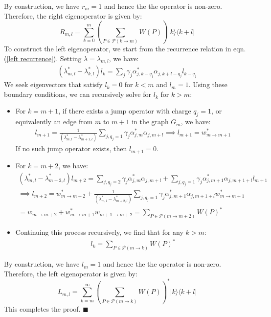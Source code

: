 \documentclass[11pt,a4paper]{article}
\begin{document}
By construction, we have $r_m = 1$ and hence the the operator is non-zero. Therefore, the right eigenoperator is given by:
\begin{equation}
    R_{m,l} = \sum_{k=0}^{m} \left( \sum_{P \in \mathcal{P}(k \to m)} W(P) \right) |k\rangle \langle k+l|
\end{equation}
To construct the left eigenoperator, we start from the recurrence relation in eqn.(\ref{left recurrence}). Setting $\lambda = \lambda_{m,l}$, we have:
\begin{align}
    \left( \lambda_{m,l}^* - \lambda_{k,l}^* \right) l_k = \sum_{j} \gamma_j \alpha_{j,k - q_j}^* \alpha_{j,k+l - q_j} l_{k - q_j}
\end{align}
We seek eigenvectors that satisfy $l_k = 0$ for $k < m$ and $l_m = 1$. Using these boundary conditions, we can recursively solve for $l_k$ for $k > m$:
\begin{itemize}
    \item For $k = m+1$, if there exists a jump operator with charge $q_j = 1$, or equivalently an edge from $m$ to $m+1$ in the graph $G_m$, we have:
    \begin{align}
    l_{m+1} = \frac{1}{ \left( \lambda_{m,l}^* - \lambda_{m+1,l}^* \right)} \sum_{j, q_j=1} \gamma_j \alpha_{j,m}^* \alpha_{j,m+l}  \implies l_{m+1} = w_{m \rightarrow m+1}^*
    \end{align}
    If no such jump operator exists, then $l_{m+1} = 0$.
    \item For $k = m+2$, we have:
    \begin{gather}
        \left( \lambda_{m,l}^* - \lambda_{m+2,l}^* \right) l_{m+2} =  \sum_{j, q_j = 2} \gamma_j \alpha_{j,m}^* \alpha_{j,m+l}  + \sum_{j, q_j = 1} \gamma_j \alpha_{j,m+1 }^* \alpha_{j,m+1+l } l_{m+1} \\
        \implies l_{m+2} =  w_{m \rightarrow m+2}^* + \frac{1}{ \left( \lambda_{m,l}^* - \lambda_{m+2,l}^* \right)} \sum_{j, q_j = 1} \gamma_j \alpha_{j,m+1}^* \alpha_{j,m+1+l } w_{m \rightarrow m+1}^* \\
        =  w_{m \rightarrow m+2} + w_{m \rightarrow m+1}^* w_{m+1 \rightarrow m+2} = \sum_{P \in \mathcal{P}(m \to m+2)} W(P)^* 
    \end{gather}
    \item Continuing this process recursively, we find that for any $k > m$:
    \begin{align}
        l_k = \sum_{P \in \mathcal{P}(m \to k)} W(P)^*
    \end{align}
\end{itemize}
By construction, we have $l_m = 1$ and hence the the operator is non-zero. Therefore, the left eigenoperator is given by:
\begin{equation}
    L_{m,l} = \sum_{k=m}^{\infty} \left( \sum_{P \in \mathcal{P}(m \to k)} W(P) \right)^* |k\rangle \langle k+l|
\end{equation}
This completes the proof. \hspace{4 mm} $\blacksquare$ \\
\end{document}
